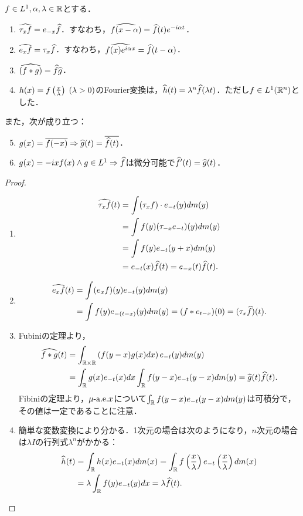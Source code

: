 \documentclass[uplatex,dvipdfmx]{jsreport}
\begin{document}
\begin{theorem}[Fourier変換の関手性]
    $f\in L^1,\alpha,\lambda\in\mathbb{R}$とする．
    \begin{enumerate}
        \item $\widehat{\tau_xf}=e_{-x}\widehat{f}$．すなわち，$\widehat{f(x-\alpha)}=\widehat{f}(t)e^{-i\alpha t}$．
        \item $\widehat{e_xf}=\tau_x\widehat{f}$．すなわち，$\widehat{f(x)e^{i\alpha x}}=\widehat{f}(t-\alpha)$．
        \item $\widehat{(f*g)}=\widehat{f}\widehat{g}$．
        \item $h(x)=f\left(\frac{x}{\lambda}\right)\;(\lambda>0)$のFourier変換は，$\widehat{h}(t)=\lambda^n\widehat{f}(\lambda t)$．ただし$f\in L^1(\mathbb{R}^n)$とした．
    \end{enumerate}
    また，次が成り立つ：
    \begin{enumerate}\setcounter{enumi}{4}
        \item $g(x)=\overline{f(-x)}\Rightarrow\widehat{g}(t)=\overline{\widehat{f}(t)}$．
        \item $g(x)=-ixf(x)\land g\in L^1\Rightarrow\widehat{f}$は微分可能で$\widehat{f}'(t)=\widehat{g}(t)$．
    \end{enumerate}
\end{theorem}
\begin{proof}\mbox{}
    \begin{enumerate}
        \item \begin{align*}
            \widehat{\tau_xf}(t)&=\int(\tau_xf)\cdot e_{-t}(y)dm(y)\\
            &=\int f(y)(\tau_{-x}e_{-t})(y)dm(y)\\
            &=\int f(y)e_{-t}(y+x)dm(y)\\
            &=e_{-t}(x)\widehat{f}(t)=e_{-x}(t)\widehat{f}(t).
        \end{align*}
        \item \begin{align*}
            \widehat{e_xf}(t)&=\int(e_xf)(y)e_{-t}(y)dm(y)\\
            &=\int f(y)e_{-(t-x)}(y)dm(y)=(f*e_{t-x})(0)=(\tau_x\widehat{f})(t).
        \end{align*}
        \item Fubiniの定理より，
        \begin{align*}
            \widehat{f*g}(t)&=\int_{\mathbb{R}\times\mathbb{R}}\left(f(y-x)g(x)dx\right)e_{-t}(y)dm(y)\\
            &=\int_{\mathbb{R}} g(x)e_{-t}(x)dx\int_{\mathbb{R}} f(y-x)e_{-t}(y-x)dm(y)=\widehat{g}(t)\widehat{f}(t).
        \end{align*}
        Fibiniの定理より，$\mu\text{-a.e.} x$について$\int_{\mathbb{R}} f(y-x)e_{-t}(y-x)dm(y)$は可積分で，その値は一定であることに注意．
        \item 簡単な変数変換により分かる．1次元の場合は次のようになり，$n$次元の場合は$\lambda I$の行列式$\lambda^n$がかかる：
        \begin{align*}
            \widehat{h}(t)&=\int_{\mathbb{R}} h(x)e_{-t}(x)dm(x)=\int_{\mathbb{R}} f\left(\frac{x}{\lambda}\right)e_{-t}\left(\frac{x}{\lambda}\right)dm(x)\\
            &=\lambda\int_{\mathbb{R}} f(y)e_{-t}(y)dx=\lambda\widehat{f}(t).
        \end{align*}
    \end{enumerate}
\end{proof}
\end{document}
